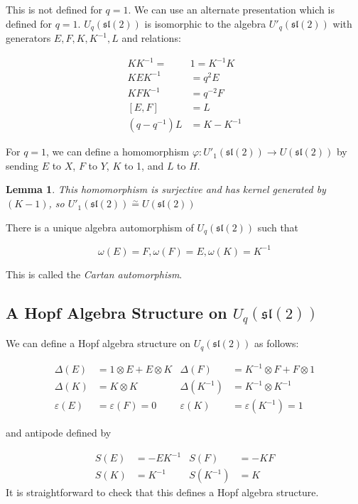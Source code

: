 \documentclass[]{article}
\newtheorem{lemma}[theorem]{Lemma}
\newcommand{\sll}{\mathfrak{sl}}
\numberwithin{equation}{subsection}
\begin{document}
This is not defined for $q = 1$. We can use an alternate presentation which is
defined for $q = 1$. $U_q(\sll(2))$ is isomorphic to the algebra
$U'_q(\sll(2))$ with generators $E,F,K,K^{-1},L$ and relations:

\begin{align}
    KK^{-1} =\ &1 = K^{-1}K \\
    KEK^{-1} &= q^2 E \\
    KFK^{-1} &= q^{-2} F \\
    [E,F] &= L \\
    (q - q^{-1})L &= K-K^{-1} 
\end{align}

For $q=1$, we can define a homomorphism $\varphi: U'_1(\sll(2)) \to
U(\sll(2))$ by sending $E$ to $X$, $F$ to $Y$, $K$ to 1, and $L$ to $H$. 
\begin{lemma}
This homomorphism is surjective and has kernel generated by $(K-1)$, so
$U'_1(\sll(2)) \stackrel{\sim}{=} U(\sll(2))$
\end{lemma}

There is a unique algebra automorphism of $U_q(\sll(2))$ such that 

\begin{equation}
    \omega(E) = F, \omega(F) = E, \omega(K) = K^{-1}
\end{equation}

This is called the \emph{Cartan automorphism}.

\subsection{A Hopf Algebra Structure on $U_q(\sll(2))$}
We can define a Hopf algebra structure on $U_q(\sll(2))$ as follows:

\begin{align}
    \Delta(E) &= 1 \otimes E + E \otimes K &  \Delta(F) &= K^{-1} \otimes F + F \otimes 1 \\
    \Delta(K) &= K \otimes K &  \Delta(K^{-1}) &= K^{-1} \otimes K^{-1}\\ 
    \varepsilon(E) &= \varepsilon(F) = 0 &  \varepsilon(K) &= \varepsilon(K^{-1}) = 1
\end{align}

and antipode defined by 

\begin{align}
    S(E) &= -EK^{-1} & S(F)      &= -KF \\
    S(K) &= K^{-1}   & S(K^{-1}) &= K 
\end{align}
It is straightforward to check that this defines a Hopf algebra structure. 
\end{document}
